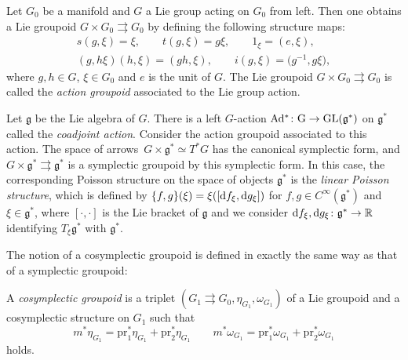 \documentclass[pdftex]{sigma}
\numberwithin{equation}{section}
\begin{document}
\begin{Example}
 Let $G_0$ be a manifold and $G$ a Lie group acting on $G_0$ from left. Then one obtains a Lie groupoid $G\times G_0\rightrightarrows G_0$ by defining the following structure maps:
 \begin{gather*}
 s(g,\xi)=\xi,\qquad t(g,\xi)=g\xi,\qquad 1_{\xi}=(e,\xi),\\
 (g,h\xi)(h,\xi)=(gh,\xi),\qquad i(g,\xi)=\bigl(g^{-1},g\xi\bigr),
 \end{gather*}
 where $g,h\in G$, $ \xi\in G_0$ and $e$ is the unit of $G$. The Lie groupoid $G\times G_0\rightrightarrows G_0$ is called the \textit{action groupoid} associated to the Lie group action.

 Let $\mathfrak{g}$ be the Lie algebra of $G$. There is a left $G$-action $\rm{Ad^\ast\colon G\to\rm{GL}(\mathfrak{g}^\ast)}$ on $\mathfrak{g}^\ast$ called the \textit{coadjoint action}. Consider the action groupoid associated to this action. The space of arrows~${G\times\mathfrak{g}^\ast\simeq T^\ast G}$ has the canonical symplectic form, and $G\times\mathfrak{g}^\ast\rightrightarrows\mathfrak{g}^\ast$ is a symplectic groupoid by this symplectic form. In this case, the corresponding Poisson structure on the space of objects $\mathfrak{g}^\ast$ is the \textit{linear Poisson structure}, which is defined by
 $\{f,g\}(\xi)=\xi([{\rm d}f_\xi,{\rm d}g_\xi])$
 for $f,g\in C^\infty(\mathfrak{g}^\ast)$ and $\xi\in\mathfrak{g}^\ast$, where $[\cdot,\cdot]$ is the Lie bracket of $\mathfrak{g}$ and we consider ${\rm d}f_\xi,{\rm d}g_\xi\colon \mathfrak{g}^\ast\to\mathbb{R}$ identifying $T_\xi\mathfrak{g}^\ast$ with $\mathfrak{g}^\ast$.
\end{Example}


The notion of a cosymplectic groupoid is defined in exactly the same way as that of a symplectic groupoid:
\begin{Definition}
 A \textit{cosymplectic groupoid} is a triplet $(G_1\rightrightarrows G_0, \eta_{G_1}, \omega_{G_1})$ of a Lie groupoid and a cosymplectic structure on $G_1$ such that
 \[m^\ast\eta_{G_1}=\textrm{pr}_1^\ast\eta_{G_1}+\textrm{pr}_2^\ast\eta_{G_1}\qquad m^\ast\omega_{G_1}=\textrm{pr}_1^\ast\omega_{G_1}+\textrm{pr}_2^\ast\omega_{G_1}\]
 holds.
\end{Definition}
\end{document}
